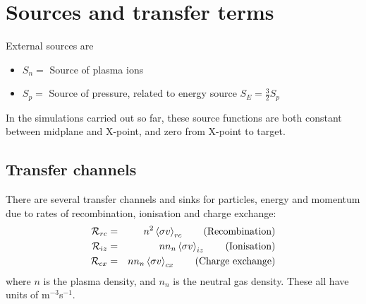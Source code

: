 \documentclass[12pt,a4paper]{article}
\begin{document}
\section{Sources and transfer terms}

External sources are
\begin{itemize}
\item $S_n = $ Source of plasma ions
\item $S_p = $ Source of pressure, related to energy source $S_E = \frac{3}{2}S_p$
\end{itemize}
In the simulations carried out so far, these source functions are both constant between midplane and X-point, and zero
from X-point to target.

\subsection{Transfer channels}

There are several transfer channels and sinks for particles, energy and momentum due to rates
of recombination, ionisation and charge exchange:
\begin{eqnarray*}
  \mathcal{R}_{rc} &=& n^2\left<\sigma v\right>_{rc}   \qquad \mbox{\textrm{(Recombination)}} \\
  \mathcal{R}_{iz} &=&  nn_n\left<\sigma v\right>_{iz} \qquad \mbox{\textrm{(Ionisation)}} \\
  \mathcal{R}_{cx} &=& nn_n\left<\sigma v\right>_{cx} \qquad \mbox{\textrm{(Charge exchange)}}
\end{eqnarray*}
where $n$ is the plasma density, and $n_n$ is the neutral gas density. These all have units of m$^{-3}$s$^{-1}$.
\end{document}
